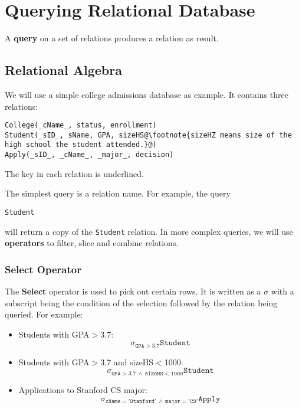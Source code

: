 \ifx\PREAMBLE\undefined


\fi
\chapter{Querying Relational Database}
A \textbf{query} on a set of relations produces a relation as result.
\section{Relational Algebra}
We will use a simple college admissions database as example. It contains three relations:
\begin{lstlisting}[escapechar=@]
College(_cName_, status, enrollment)
Student(_sID_, sName, GPA, sizeHS@\footnote{sizeHZ means size of the high school the student attended.}@)
Apply(_sID_, _cName_, _major_, decision)
\end{lstlisting}
The key in each relation is underlined.

The simplest query is a relation name. For example, the query
\begin{center}
\texttt{Student}
\end{center}
will return a copy of the \texttt{Student} relation. In more complex queries, we will use \textbf{operators} to filter, slice and combine relations.
\subsection{Select Operator}
The \textbf{Select} operator is used to pick out certain rows. It is written as a $\sigma$ with a subscript being the condition of the selection followed by the relation being queried. For example:
\begin{itemize}
\item Students with GPA$>$3.7: $$\mathtt{\sigma_{GPA>3.7}Student}$$
\item Students with GPA$>$3.7 and sizeHS$<$1000: $$\mathtt{\sigma_{GPA>3.7\:\land\: sizeHS<1000}Student}$$
\item Applications to Stanford CS major: $$\mathtt{\sigma_{cName='Stanford'\:\land\: major='CS'}Apply}$$
\end{itemize}
